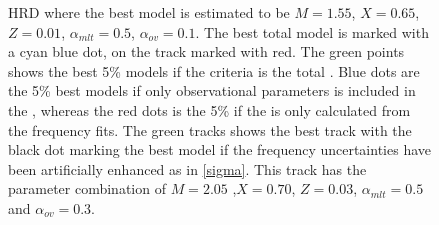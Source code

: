 \begin{figure}[htbp]
	\centering
	\caption{HRD where the best model is estimated to be $M=1.55$\msun, $X=0.65$, $Z=0.01$, $\alpha_{mlt} = 0.5$, $\alpha_{ov} = 0.1$. The best total model is marked with a cyan blue dot, on the track marked with red. The green points shows the best 5\% models if the criteria is the total \chis. Blue dots are the 5\% best models if only observational parameters is included in the \chis, whereas the red dots is the 5\% if the \chis is only calculated from the frequency fits. The green tracks shows the best track with the black dot marking the best model if the frequency uncertainties have been artificially enhanced as in \eqref{sigma}. This track has the parameter combination of $M =2.05$ ,$X = 0.70$, $Z=0.03$, $\alpha_{mlt}=0.5$ and $\alpha_{ov}=0.3$.}
	\label{hrd44taulenz}
\end{figure}
